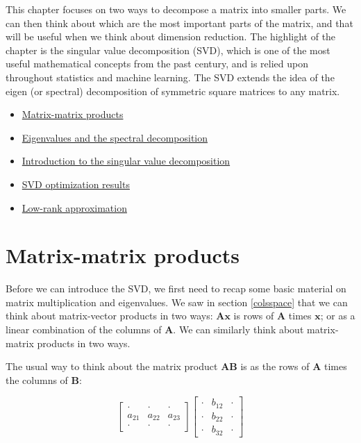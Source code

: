 \documentclass[
]{book}
\providecommand{\tightlist}{%
  \setlength{\itemsep}{0pt}\setlength{\parskip}{0pt}}
\theoremstyle{definition}
\theoremstyle{definition}
\theoremstyle{definition}
\theoremstyle{definition}
\theoremstyle{remark}
\begin{document}
This chapter focuses on two ways to decompose a matrix into smaller parts. We can then think about which are the most important parts of the matrix, and that will be useful when we think about dimension reduction. The highlight of the chapter is the singular value decomposition (SVD), which is one of the most useful mathematical concepts from the past century, and is relied upon throughout statistics and machine learning. The SVD extends the idea of the eigen (or spectral) decomposition of symmetric square matrices to any matrix.

\begin{itemize}
\tightlist
\item
  \href{https://mediaspace.nottingham.ac.uk/media/Matrix-matrix+products/1_kelw2beu}{Matrix-matrix products}
\item
  \href{https://mediaspace.nottingham.ac.uk/media/Eigenvalues+and+the+spectral+decomposition/1_drbz1eg8}{Eigenvalues and the spectral decomposition}
\item
  \href{https://mediaspace.nottingham.ac.uk/media/Singular+value+decompositionA+introduction/1_okyjnqic}{Introduction to the singular value decomposition}
\item
  \href{https://mediaspace.nottingham.ac.uk/media/Singular+value+decompositionA+optimization+results/1_9jv8zfw0}{SVD optimization results}
\item
  \href{https://mediaspace.nottingham.ac.uk/media/Singular+value+decompositionA+low+rank+approximation/1_vwbtjdzo}{Low-rank approximation}
\end{itemize}

\hypertarget{matrix-matrix}{%
\section{Matrix-matrix products}\label{matrix-matrix}}

Before we can introduce the SVD, we first need to recap some basic material on matrix multiplication and eigenvalues.
We saw in section \ref{colsspace} that we can think about matrix-vector products in two ways: \(\mathbf A\mathbf x\) is rows of \(\mathbf A\) times \(\mathbf x\); or as a linear combination of the columns of \(\mathbf A\). We can similarly think about matrix-matrix products in two ways.

The usual way to think about the matrix product \(\mathbf A\mathbf B\) is as the rows of \(\mathbf A\) times the columns of \(\mathbf B\):

\[\left[ \begin{array}{ccc}
\cdot & \cdot &\cdot\\
a_{21}&a_{22}&a_{23}\\
\cdot & \cdot &\cdot
\end{array}
\right]\left[\begin{array}{ccc}
\cdot & b_{12} &\cdot\\
\cdot&b_{22}&\cdot\\
\cdot & b_{32} &\cdot
\end{array}
\right]\]
\end{document}
